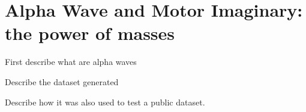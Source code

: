 \chapter{Alpha Wave and Motor Imaginary: the power of masses}

First describe what are alpha waves

Describe the dataset generated

Describe how it was also used to test a public dataset.

